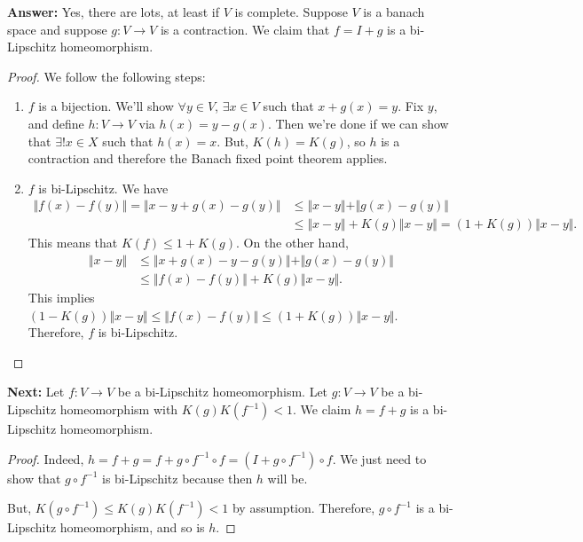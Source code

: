 \documentclass{report}
\begin{document}
\noindent \textbf{Answer:} Yes, there are lots, at least if $V$ is complete. Suppose $V$ is a banach space and suppose $g: V \to V$ is a contraction. We claim that $f = I + g$ is a bi-Lipschitz homeomorphism.
\begin{proof} We follow the following steps:

    \begin{enumerate}
        \item $f$ is a bijection. We'll show $\forall y \in V$, $\exists  x \in V$ such that $x + g(x) = y$. Fix $y$, and define $h : V\to V$ via $h(x) = y - g(x)$. Then we're done if we can show that $\exists !  x \in X$ such that $h(x) = x$. But, $K(h) = K(g)$, so $h$ is a contraction and therefore the Banach fixed point theorem applies. 
        \item $f $ is bi-Lipschitz. We have 
        \begin{align*}
            \Vert f(x) - f(y) \Vert  = \Vert x- y  + g(x) - g(y) \Vert &\leq \Vert x-y \Vert  + \Vert g(x) - g(y) \Vert \\
            &\leq \Vert x - y \Vert + K(g) \Vert x- y\Vert = (1 + K(g)) \Vert x- y \Vert.
        \end{align*}
        This means that $K(f) \leq 1  + K(g)$. On the other hand, 
        \begin{align*}
            \Vert x- y \Vert &\leq \Vert x + g(x) - y - g(y) \Vert  + \Vert g(x) - g(y) \Vert\\
            &\leq \Vert f(x) - f(y) \Vert + K(g) \Vert x- y \Vert.
        \end{align*}
        This implies $(1 - K(g)) \Vert x- y\Vert \leq \Vert f(x) - f(y) \Vert \leq (1 + K(g)) \Vert x- y \Vert$. Therefore, $f$ is bi-Lipschitz. 
    \end{enumerate}
\end{proof}
\newpage
\noindent \textbf{Next:} Let $f:  V \to V$ be a bi-Lipschitz homeomorphism. Let $g: V \to V$ be a bi-Lipschitz homeomorphism with $K(g)K(f^{-1}) < 1$. We claim $h = f +g$ is a bi-Lipschitz homeomorphism. 
\begin{proof}
    Indeed, $h = f + g = f + g \circ f^{-1} \circ f = (I + g \circ f^{-1}) \circ f$. We just need to show that $g \circ f^{-1}$ is bi-Lipschitz because then $h$ will be. 

    But, $K(g \circ f^{-1}) \leq K(g)K(f^{-1}) < 1$ by assumption. Therefore, $g \circ f^{-1}$ is a bi-Lipschitz homeomorphism, and so is $h$. 
\end{proof}
\end{document}
